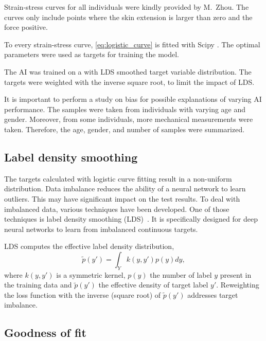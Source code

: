 Strain-stress curves for all individuals were kindly provided by M.\ Zhou.
The curves only include points where the skin extension is larger than zero and the force positive.

To every strain-stress curve, \cref{eq:logistic_curve} is fitted with Scipy \cite{2020SciPy-NMeth}.
The optimal parameters were used as targets for training the model.

The AI was trained on a with LDS smoothed target variable distribution.
The targets were weighted with the inverse square root, to limit the impact of LDS.

It is important to perform a study on bias for possible explanations of varying AI performance.
The samples were taken from individuals with varying age and gender.
Moreover, from some individuals, more mechanical measurements were taken.
Therefore, the age, gender, and number of samples were summarized.


\subsection{Label density smoothing}
The targets calculated with logistic curve fitting result in a non-uniform distribution.
Data imbalance reduces the ability of a neural network to learn outliers.
This may have significant impact on the test results.
To deal with imbalanced data, various techniques have been developed.
One of those techniques is label density smoothing (LDS)~\cite{yang2021delving}.
It is specifically designed for deep neural networks to learn from imbalanced continuous targets.

\newcommand{\edtl}{$\tilde{p}(y')$ }
LDS computes the effective label density distribution,
\begin{equation}
    \tilde{p}(y') = \int_Y k(y, y')p(y)dy,
\end{equation}
where $k(y,y')$ is a symmetric kernel, $p(y)$ the number of label $y$ present in the training data and \edtl the effective density of target label $y'$.
Reweighting the loss function with the inverse (square root) of \edtl addresses target imbalance.

\subsection{Goodness of fit}

